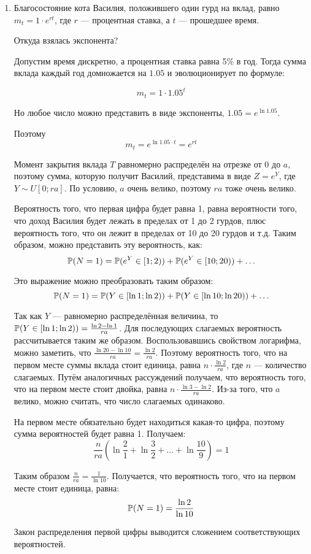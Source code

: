 \begin{enumerate}
\item Благосостояние кота Василия, положившего один гурд на вклад,
равно $m_t = 1\cdot e^{rt}$, где $r$ — процентная ставка, а $t$ — прошедшее время.

Откуда взялась экспонента?

Допустим время дискретно, а процентная ставка равна 5\% в год. 
Тогда сумма вклада каждый год домножается на $1.05$ и эволюционирует по формуле:

\[
m_t = 1 \cdot 1.05^t
\]

Но любое число можно представить в виде экспоненты, $1.05 = e^{\ln 1.05}$.

Поэтому
\[
m_t = e^{\ln 1.05 \cdot t}  = e^{rt}
\]


Момент закрытия вклада $T$ равномерно распределён на отрезке от 0 до $a$,
поэтому сумма, которую получит Василий, представима в виде $Z = e^{Y}$, где $Y \sim U[0; ra]$.
По условию, $a$ очень велико, поэтому $ra$ тоже очень велико.

Вероятность того, что первая цифра будет равна 1, равна вероятности того,
что доход Василия будет лежать в пределах от 1 до 2 гурдов, плюс вероятность того,
что он лежит в пределах от 10 до 20 гурдов и т.д.
Таким образом, можно представить эту вероятность, как:
\[
\P(N=1) = \P(e^Y \in [1;2) ) + \P(e^Y \in [10; 20) ) + \ldots
\]

Это выражение можно преобразовать таким образом:
\[
\P(N=1) = \P(Y \in [\ln 1; \ln2) ) + \P(Y \in [\ln 10; \ln 20) ) + \ldots
\]

Так как $Y$ — равномерно распределённая величина,
то $\P(Y \in [\ln 1; \ln2) ) = \frac{\ln 2 - \ln 1}{ra}$.
Для последующих слагаемых вероятность рассчитывается таким же образом.
Воспользовавшись свойством логарифма, можно заметить,
что $\frac{\ln 20 - \ln 10}{ra} = \frac{\ln 2}{ra}$.
Поэтому вероятность того, что на первом месте суммы вклада стоит единица,
равна $n\cdot \frac{\ln 2}{ra}$, где $n$ — количество слагаемых.
Путём аналогичных рассуждений получаем, что вероятность того,
что на первом месте стоит двойка, равна $n\cdot \frac{\ln 3- \ln 2}{ra}$.
Из-за того, что $a$ велико, можно считать, что число слагаемых одинаково.

На первом месте обязательно будет находиться какая-то цифра,
поэтому сумма вероятностей будет равна 1. Получаем:
\[
\dfrac{n}{ra}\left(\ln \frac{2}{1} + \ln \frac{3}{2} + \ldots + \ln \frac{10}{9}\right) = 1
\]

Таким образом $\frac{n}{ra} = \frac{1}{\ln 10}$.
Получается, что вероятность того, что на первом месте стоит единица, равна:
\[
\P (N=1) = \dfrac{\ln 2}{\ln 10}
\]

Закон распределения первой цифры выводится сложением соответствующих вероятностей.
\end{enumerate}



